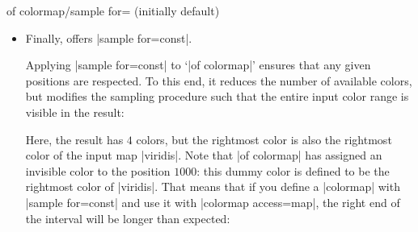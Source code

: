 {\begin{enumerate}
\begin{pgfplotskey}{of colormap/sample for= (initially default)}
\begin{itemize}
                    Technically, this means that it implicitly sets
                    |colormap access/extra interval width=0| (the default is
                    |colormap access/extra interval width=h|). The color
                    associated with $1000$ has no interval and is essentially
                    invisible.

                    Restoring |colormap access/extra interval width=h| results
                    in rescaled positions which is typically not what you want:
\begin{codeexample}[]
\pgfplotscolorbardrawstandalone[
    colormap={example}{
        samples of colormap={
            5 of viridis,
            target pos={0,500,850,950,1000},
        },
    },
    colormap access/extra interval width=h,
    colorbar horizontal,
    colormap access=const]
\end{codeexample}
                \item Finally, \PGFPlots{} offers |sample for=const|.

                    Applying |sample for=const| to `|of colormap|' ensures that
                    any given positions are respected. To this end, it reduces
                    the number of available colors, but modifies the sampling
                    procedure such that the entire input color range is visible
                    in the result:
\begin{codeexample}[]
\pgfplotscolorbardrawstandalone[
    colormap={example}{
        of colormap={
            viridis,
            target pos={0,500,850,950,1000},
            sample for=const,
        },
    },
    colorbar horizontal,
    colormap access=const]
\end{codeexample}
                    Here, the result has $4$ colors, but the rightmost color is
                    also the rightmost color of the input map |viridis|. Note
                    that |of colormap| has assigned an invisible color to the
                    position $1000$: this dummy color is defined to be the
                    rightmost color of |viridis|. That means that if you define
                    a |colormap| with |sample for=const| and use it with
                    |colormap access=map|, the right end of the interval will
                    be longer than expected:
\begin{codeexample}[]
\pgfplotscolorbardrawstandalone[
    colormap={example}{
        of colormap={
            viridis,
            target pos={0,500,850,950,1000},
            sample for=const,
        },
    },
    colorbar horizontal,
    colormap access=map]
\end{codeexample}


\end{itemize}
\end{pgfplotskey}
\end{enumerate}}
